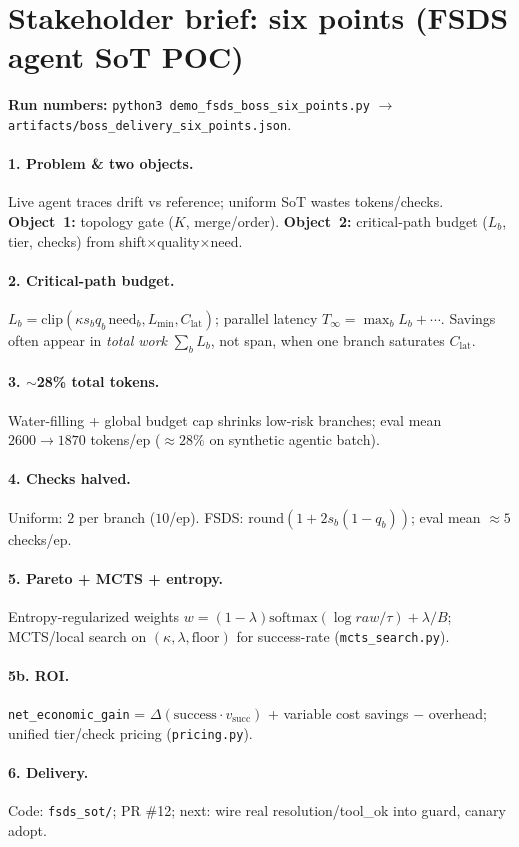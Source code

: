 \section*{Stakeholder brief: six points (FSDS agent SoT POC)}
\small
\textbf{Run numbers:} \texttt{python3 demo\_fsds\_boss\_six\_points.py} $\rightarrow$
\texttt{artifacts/boss\_delivery\_six\_points.json}.

\paragraph{1. Problem \& two objects.}
Live agent traces drift vs reference; uniform SoT wastes tokens/checks.
\textbf{Object~1:} topology gate ($K$, merge/order).
\textbf{Object~2:} critical-path budget ($L_b$, tier, checks) from shift$\times$quality$\times$need.

\paragraph{2. Critical-path budget.}
$L_b=\mathrm{clip}(\kappa s_b q_b \,\mathrm{need}_b, L_{\min}, C_{\mathrm{lat}})$;
parallel latency $T_\infty=\max_b L_b+\cdots$.
Savings often appear in \emph{total work} $\sum_b L_b$, not span, when one branch saturates $C_{\mathrm{lat}}$.

\paragraph{3. $\sim$28\% total tokens.}
Water-filling + global budget cap shrinks low-risk branches; eval mean
$2600\rightarrow 1870$ tokens/ep ($\approx 28\%$ on synthetic agentic batch).

\paragraph{4. Checks halved.}
Uniform: $2$ per branch ($10$/ep). FSDS: $\mathrm{round}(1+2s_b(1-q_b))$;
eval mean $\approx 5$ checks/ep.

\paragraph{5. Pareto + MCTS + entropy.}
Entropy-regularized weights
$w=(1-\lambda)\mathrm{softmax}(\log raw/\tau)+\lambda/B$;
MCTS/local search on $(\kappa,\lambda,\mathrm{floor})$ for success-rate
(\texttt{mcts\_search.py}).
\paragraph{5b. ROI.}
\texttt{net\_economic\_gain} = $\Delta(\mathrm{success}\cdot v_{\mathrm{succ}})$ +
variable cost savings $-$ overhead; unified tier/check pricing (\texttt{pricing.py}).

\paragraph{6. Delivery.}
Code: \texttt{fsds\_sot/}; PR \#12; next: wire real resolution/tool\_ok into guard, canary adopt.
